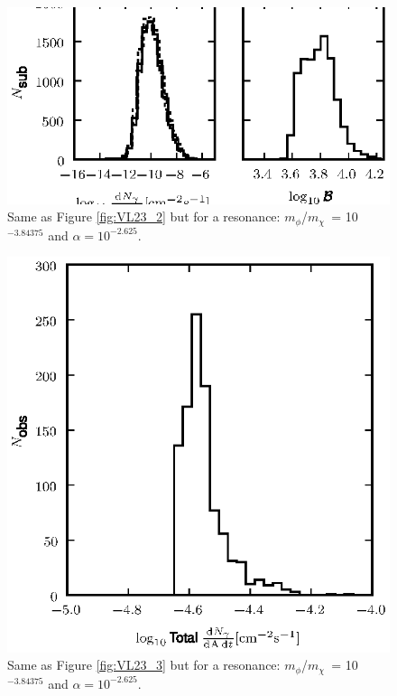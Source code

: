 \documentclass[aps,prd,twocolumn,amsmath,amssymb,floatfix,nofootinbib,10pt]{revtex4}
\newcommand{\mdm}{\ensuremath{m_{\chi}}}
\newcommand{\mv}{\ensuremath{m_{\phi}}}
\begin{document}
\begin{figure}
\centering
\includegraphics{hist_-3.84375_-2.625_10_2.eps}
\caption{Same as Figure \ref{fig:VL23_2} but for a resonance:
\mv/\mdm\ = 10$^{-3.84375}$ and $\alpha = 10^{-2.625}$.}%
\label{fig:VLresonance1}%
\end{figure}


\begin{figure}
\centering
\includegraphics{hist_-3.84375_-2.625_10_3.eps}
\caption{Same as Figure \ref{fig:VL23_3} but for a resonance:
\mv/\mdm\ = 10$^{-3.84375}$ and $\alpha = 10^{-2.625}$.}%
\label{fig:VLresonance2}%
\end{figure}
\end{document}
